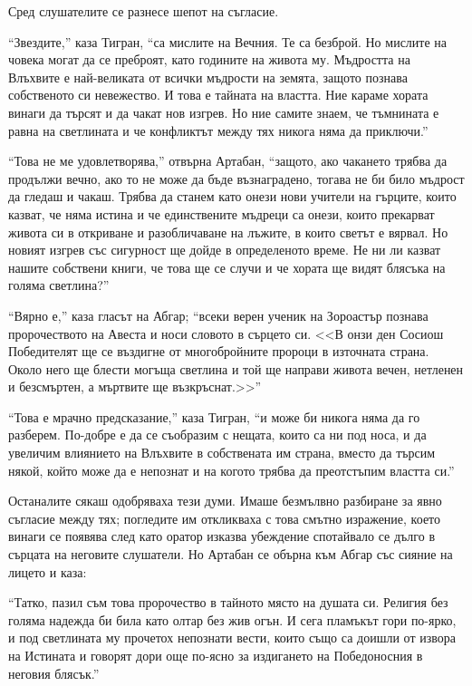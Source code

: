 \documentclass[oneside,10pt]{memoir}
\begin{document}
Сред слушателите се разнесе шепот на съгласие.

``Звездите,'' каза Тигран, ``са мислите на Вечния. Те са безброй. Но мислите на
човека могат да се преброят, като годините на живота му. Мъдростта на Влъхвите е
най-великата от всички мъдрости на земята, защото познава собственото си
невежество. И това е тайната на властта. Ние караме хората винаги да търсят и да
чакат нов изгрев. Но ние самите знаем, че тъмнината е равна на светлината и че
конфликтът между тях никога няма да приключи.''

``Това не ме удовлетворява,'' отвърна Артабан, ``защото, ако чакането трябва да
продължи вечно, ако то не може да бъде възнаградено, тогава не би било мъдрост
да гледаш и чакаш. Трябва да станем като онези нови учители на гърците, които
казват, че няма истина и че единствените мъдреци са онези, които прекарват
живота си в откриване и разобличаване на лъжите, в които светът е вярвал. Но
новият изгрев със сигурност ще дойде в определеното време. Не ни ли казват
нашите собствени книги, че това ще се случи и че хората ще видят блясъка на
голяма светлина?''

``Вярно е,'' каза гласът на Абгар; ``всеки верен ученик на Зороастър познава
пророчеството на Авеста и носи словото в сърцето си. <<В онзи ден Сосиош
Победителят ще се въздигне от многобройните пророци в източната страна. Около
него ще блести могъща светлина и той ще направи живота вечен, нетленен и
безсмъртен, а мъртвите ще възкръснат.>>''

``Това е мрачно предсказание,'' каза Тигран, ``и може би никога няма да го
разберем. По-добре е да се съобразим с нещата, които са ни под носа, и да
увеличим влиянието на Влъхвите в собствената им страна, вместо да търсим някой,
който може да е непознат и на когото трябва да преотстъпим властта си.''

Останалите сякаш одобряваха тези думи. Имаше безмълвно разбиране за явно
съгласие между тях; погледите им откликваха с това смътно изражение, което
винаги се появява след като оратор изказва убеждение спотайвало се дълго в
сърцата на неговите слушатели. Но Артабан се обърна към Абгар със сияние на
лицето и каза:

``Татко, пазил съм това пророчество в тайното място на душата си. Религия без
голяма надежда би била като олтар без жив огън. И сега пламъкът гори по-ярко, и
под светлината му прочетох непознати вести, които също са доишли от извора на
Истината и говорят дори още по-ясно за издигането на Победоносния в неговия
блясък.''
\end{document}
